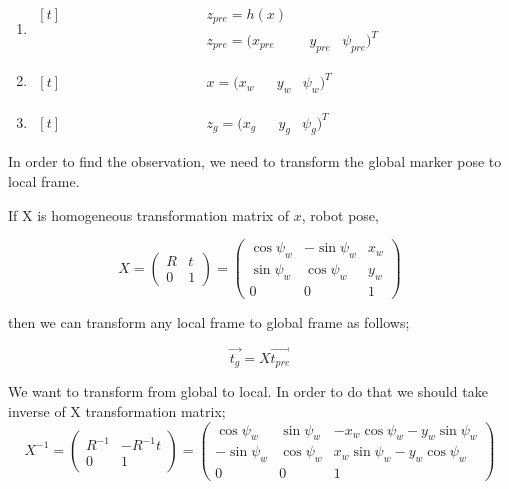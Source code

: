 \documentclass[14pt,a4paper]{article}
\begin{document}
		\begin{enumerate}
		\item $\begin{aligned}[t]
		    &&&&&&&&&&&&& z_{pre}=h(x) \\
		    &&&&&&&&&&&&& z_{pre} = (x_{pre}&&y_{pre}&\psi_{pre})^T
		\end{aligned}$
		\item $\begin{aligned}[t]
		    &&&&&&&&&&&&& x = (x_{w}&&y_{w}&\psi_{w})^T
		\end{aligned}$
		\item $\begin{aligned}[t]
		    &&&&&&&&&&&&& z_{g} = (x_{g}&&y_{g}&\psi_{g})^T
		\end{aligned}$
		\end{enumerate}
	
		In order to find the observation, we need to transform the global marker pose to local frame.
		
		If X is homogeneous transformation matrix of $x$, robot pose,
		
		$$	X =	\begin{pmatrix} 
					R & t \\
					0 & 1 
				\end{pmatrix}
			=	\begin{pmatrix}
					\cos\psi_{w}	 &	-\sin\psi_{w} & x_{w}\\	
					\sin\psi_{w} &	\cos\psi_{w}	 & y_{w}\\
					0		 &		0	&	1
				\end{pmatrix}
		$$	
		
		then we can transform any local frame to global frame as follows;
		
				\[\vec{t_g}= X \vec{t_{pre}} \]
				
		We want to transform from global to local. In order to do that we should take inverse of X transformation matrix;
		$$	X^{-1} =	\begin{pmatrix} 
		
					R^{-1} & -R^{-1}t \\
					0 & 1 
				\end{pmatrix}
			=	\begin{pmatrix}
					\cos\psi_{w}	 &	\sin\psi_{w} & -x_{w}\cos\psi_{w}-y_{w}\sin\psi_{w}\\	
					-\sin\psi_{w} &	\cos\psi_{w}	 &  x_{w}\sin\psi_{w}-y_{w}\cos\psi_{w}\\
					0		 &		0	&	1
				\end{pmatrix}
		$$
		
\end{document}
